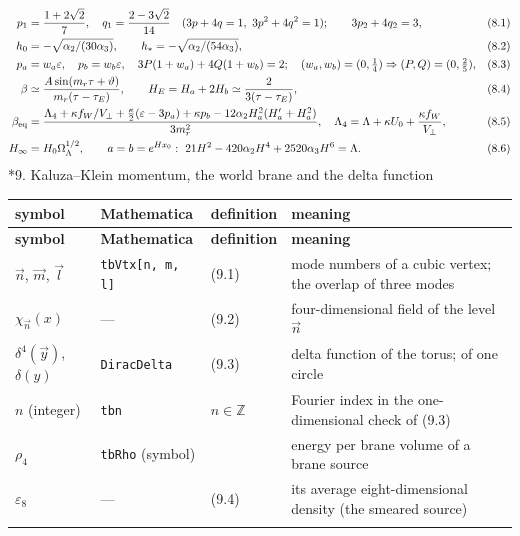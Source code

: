 \documentclass[10pt,a4paper]{article}
\makeatletter
\renewcommand\section{\@startsection{section}{1}{\z@}{-3.5ex \@plus -1ex \@minus -.2ex}{2.3ex \@plus.2ex}{\normalfont\Large\bfseries\raggedright}}
\makeatother
\begin{document}
\begin{align*}
p_1&=\frac{1+2\sqrt2}7,\quad q_1=\frac{2-3\sqrt2}{14}\quad(3p+4q=1,\ 3p^2+4q^2=1);\qquad 3p_2+4q_2=3,&&(8.1) \\
h_0&=-\sqrt{\alpha_2/(30\alpha_3)},\qquad h_*=-\sqrt{\alpha_2/(54\alpha_3)},&&(8.2) \\
p_a&=w_a\varepsilon,\quad p_b=w_b\varepsilon,\quad 3P(1+w_a)+4Q(1+w_b)=2;\quad (w_a,w_b)=(0,\tfrac14)\Rightarrow(P,Q)=(0,\tfrac25),&&(8.3) \\
\beta&\simeq\frac{A\sin(m_r\tau+\vartheta)}{m_r(\tau-\tau_E)},\qquad H_E=H_a+2H_b\simeq\frac2{3(\tau-\tau_E)},&&(8.4) \\
\beta_{\rm eq}&=\frac{\Lambda_4+\kappa f_W/V_\perp+\frac\kappa2(\varepsilon-3p_a)+\kappa p_b-12\alpha_2H_a^2(H_a'+H_a^2)}{3m_r^2},\quad \Lambda_4=\Lambda+\kappa U_0+\frac{\kappa f_W}{V_\perp},&&(8.5) \\
H_\infty&=H_0\Omega_\Lambda^{1/2},\qquad a=b=e^{Hx_0}:\ 21H^2-420\alpha_2H^4+2520\alpha_3H^6=\Lambda .&&(8.6)
\end{align*}
\section*{9. Kaluza–Klein momentum, the world brane and the delta function}
{\small
\begin{longtable}{>{\raggedright\arraybackslash}p{}>{\raggedright\arraybackslash}p{}>{\raggedright\arraybackslash}p{}>{\raggedright\arraybackslash}p{}}
\toprule
\textbf{symbol} & \textbf{Mathematica} & \textbf{definition} & \textbf{meaning} \\
\midrule\endfirsthead
\toprule
\textbf{symbol} & \textbf{Mathematica} & \textbf{definition} & \textbf{meaning} \\
\midrule\endhead
\endfoot
\bottomrule\endlastfoot
$\vec n$, $\vec m$, $\vec l$ & \texttt{tbVtx[n, m, l]} & (9.1) & mode numbers of a cubic vertex; the overlap of three modes \\
$\chi_{\vec n}(x)$ & — & (9.2) & four-dimensional field of the level $\vec n$ \\
$\delta^4(\vec y)$, $\delta(y)$ & \texttt{DiracDelta} & (9.3) & delta function of the torus; of one circle \\
$n$ (integer) & \texttt{tbn} & $n\in\mathbb Z$ & Fourier index in the one-dimensional check of (9.3) \\
$\rho_4$ & \texttt{tbRho} (symbol) &  & energy per brane volume of a brane source \\
$\varepsilon_8$ & — & (9.4) & its average eight-dimensional density (the smeared source) \\*
\end{longtable}}
\end{document}
